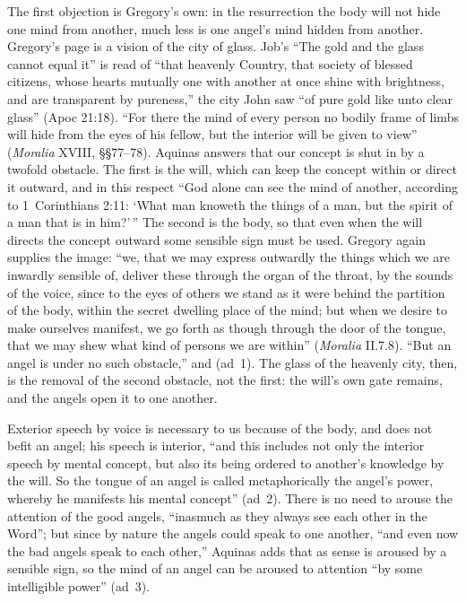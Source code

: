 The first objection is Gregory's own: in the resurrection the body will not
hide one mind from another, much less is one angel's mind hidden from
another. Gregory's page is a vision of the city of glass. Job's ``The gold
and the glass cannot equal it'' is read of ``that heavenly Country, that
society of blessed citizens, whose hearts mutually one with another at once
shine with brightness, and are transparent by pureness,'' the city John saw
``of pure gold like unto clear glass'' (Apoc 21:18). ``For there the mind of
every person no bodily frame of limbs will hide from the eyes of his fellow,
but the interior will be given to view'' (\emph{Moralia} XVIII, \S\S77--78).
Aquinas answers that our concept is shut in by a twofold obstacle. The first
is the will, which can keep the concept within or direct it outward, and in
this respect ``God alone can see the mind of another, according to 1~Corinthians
 2:11: `What man knoweth the things of a man, but the spirit of a
man that is in him?'\,'' The second is the body, so that even when the will
directs the concept outward some sensible sign must be used. Gregory again
supplies the image: ``we, that we may express outwardly the things which we
are inwardly sensible of, deliver these through the organ of the throat, by
the sounds of the voice, since to the eyes of others we stand as it were
behind the partition of the body, within the secret dwelling place of the
mind; but when we desire to make ourselves manifest, we go forth as though
through the door of the tongue, that we may shew what kind of persons we are
within'' (\emph{Moralia} II.7.8). ``But an angel is under no such obstacle,''
and  (ad~1). The glass of the heavenly city, then, is the removal of
the second obstacle, not the first: the will's own gate remains, and the
angels open it to one another.

Exterior speech by voice is necessary to us because of the body, and does
not befit an angel; his speech is interior, ``and this includes not only
the interior speech by mental concept, but also its being ordered to
another's knowledge by the will. So the tongue of an angel is called
metaphorically the angel's power, whereby he manifests his mental concept''
(ad~2). There is no need to arouse the attention of the good angels,
``inasmuch as they always see each other in the Word''; but since by
nature the angels could
speak to one another, ``and even now the bad angels speak to each other,''
Aquinas adds that as sense is aroused by a sensible sign, so the mind of an
angel can be aroused to attention ``by some intelligible power'' (ad~3).

